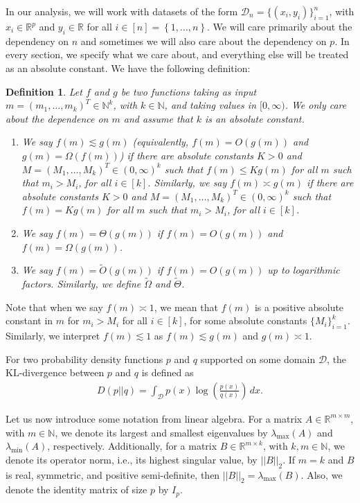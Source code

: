 \documentclass{article}
\newtheorem{definition}{Definition}[section]
\begin{document}
In our analysis, we will work with datasets of the form $\mathcal{D}_n = \{(x_i, y_i)\}_{i = 1}^n$, with $x_i \in \mathbb{R}^p$ and $y_i \in \mathbb{R}$ for all $i \in [n] = \left\{1, \dots, n\right\}$. We will care primarily about the dependency on $n$ and sometimes we will also care about the dependency on $p$. In every section, we specify what we care about, and everything else will be treated as an absolute constant. We have the following definition:
\begin{definition}
Let $f$ and $g$ be two functions taking as input $m = (m_1, \dots, m_k)^T \in \mathbb{N}^{k}$, with $k \in \mathbb{N}$, and taking values in $[0, \infty)$. We only care about the dependence on $m$ and assume that $k$ is an absolute constant. 
\begin{enumerate}[label=(\roman*)]
\item We say $f(m) \lesssim g(m)$ (equivalently, $f(m) = O(g(m))$ and $g(m) = \Omega(f(m))$) if there are absolute constants $K > 0$ and $M = (M_1, \dots, M_k)^T \in (0, \infty)^k$ such that $f(m) \leq Kg(m)$ for all $m$ such that $m_i > M_i$, for all $i \in [k]$. Similarly, we say $f(m) \asymp g(m)$ if there are absolute constants $K > 0$ and $M = (M_1, \dots, M_k)^T \in (0, \infty)^k$ such that $f(m) = Kg(m)$ for all $m$ such that $m_i > M_i$, for all $i \in [k]$.
\item We say $f(m) = \Theta(g(m))$ if $f(m) = O(g(m))$ and $f(m) = \Omega(g(m))$.
\item We say $f(m) = \widetilde{O}(g(m))$ if $f(m) = O(g(m))$ up to logarithmic factors. Similarly, we define $\widetilde{\Omega}$ and $\widetilde{\Theta}$.
\end{enumerate}
\end{definition}
Note that when we say $f(m) \asymp 1$, we mean that $f(m)$ is a positive absolute constant in $m$ for $m_i > M_i$ for all $i \in [k]$, for some absolute constants $\{M_i\}_{i = 1}^k$. Similarly, we interpret $f(m) \lesssim 1$ as $f(m) \lesssim g(m)$ and $g(m) \asymp 1$.

For two probability density functions $p$ and $q$ supported on some domain $\mathcal{D}$, the $\mathrm{KL}$-divergence between $p$ and $q$ is defined as
\begin{align*}
D(p||q) = \int_{\mathcal{D}}p(x)\log\left(\frac{p(x)}{q(x)}\right) \, dx.
\end{align*}

Let us now introduce some notation from linear algebra. For a matrix $A \in \mathbb{R}^{m \times m}$, with $m \in \mathbb{N}$, we denote its largest and smallest eigenvalues by $\lambda_{\max}(A)$ and $\lambda_{\min}(A)$, respectively. Additionally, for a matrix $B \in \mathbb{R}^{m \times k}$, with $k, m \in \mathbb{N}$, we denote its operator norm, i.e., its highest singular value, by $||B||_2$. If $m = k$ and $B$ is real, symmetric, and positive semi-definite, then $||B||_2 = \lambda_{\max}(B)$. Also, we denote the identity matrix of size $p$ by $I_p$.
\end{document}
